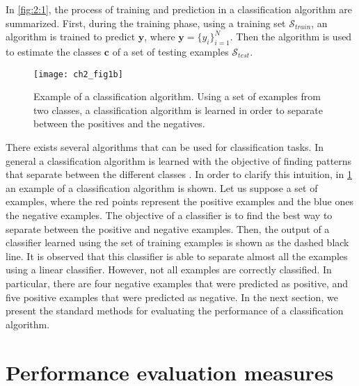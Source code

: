 In \figurename{ \ref{fig:2:1}}, the process of training and prediction in a classification 
algorithm are summarized. First, during the training phase, using a training set 
$\mathcal{S}_{train}$, an algorithm is trained to predict $\mathbf{y}$, where
$\mathbf{y}=\{y_i\}_{i=1}^{N}$. Then the algorithm is used to estimate the classes 
$\mathbf{c}$ of a set of testing examples $\mathcal{S}_{test}$.

\begin{figure}[!t]
\centering
\texttt{[image: ch2\_fig1b]}
\caption{Example of a classification algorithm. Using a set of examples from two classes, a 
	classification algorithm is learned in order to separate between the positives and the negatives. 
}
\label{fig:2:2}
\end{figure} 

There exists several algorithms that can be used for classification tasks. In general a 
classification algorithm is learned with the objective of finding patterns that separate between 
the different classes \citep{Hastie2009}. In order to clarify this intuition, in \figurename{ 
\ref{fig:2:2}} an example of a classification algorithm is shown. Let us suppose a set of 
examples, where the red points represent the positive examples and the blue ones the negative 
examples. The objective of a classifier is to find the best way to separate between the positive and 
negative examples. Then, the output of a classifier learned using the set of training examples is 
shown as the dashed black line. It is observed that this classifier is able to separate almost all 
the examples using a linear classifier. However, not all examples are correctly classified. In 
particular, there are four negative examples that were predicted as positive, and five positive 
examples that were predicted as negative. In the next section, we present the standard methods for 
evaluating the performance of a classification algorithm.


\section{Performance evaluation measures}
\label{sec:2:measures}

